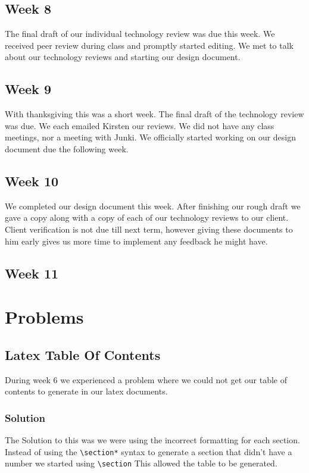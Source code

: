 \documentclass[onecolumn, draftclsnofoot,10pt, compsoc]{IEEEtran}
\begin{document}
		\subsection{Week 8}
		The final draft of our individual technology review was due this week. We received peer review during class and promptly started editing.
		We met to talk about our technology reviews and starting our design document.

		\subsection{Week 9}
		With thanksgiving this was a short week. The final draft of the technology review was due. We each emailed Kirsten our reviews.
		We did not have any class meetings, nor a meeting with Junki.
		We officially started working on our design document due the following week.

		\subsection{Week 10}
		We completed our design document this week. After finishing our rough draft we gave a copy along with a copy of each of our technology reviews to our client.
		Client verification is not due till next term, however giving these documents to him early gives us more time to implement any feedback he might have.

		\subsection{Week 11}

		\section{Problems}
			\subsection{Latex Table Of Contents}
				During week 6 we experienced a problem where we could not get our table
				of contents to generate in our latex documents.
				\subsubsection{Solution}
					The Solution to this was we were using the incorrect formatting for each
					section. Instead of using the \verb|\section*| syntax to generate a section that
					didn't have a number we started using \verb|\section| This allowed the table
					to be generated.
\end{document}
